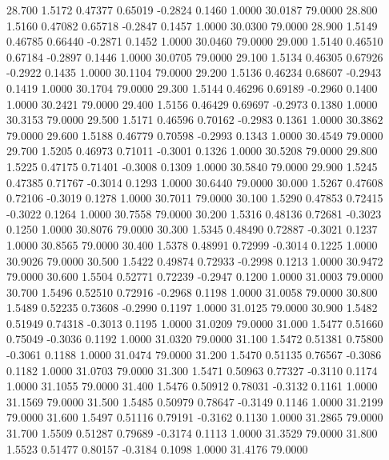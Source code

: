   28.700   1.5172   0.47377   0.65019  -0.2824   0.1460   1.0000  30.0187  79.0000
  28.800   1.5160   0.47082   0.65718  -0.2847   0.1457   1.0000  30.0300  79.0000
  28.900   1.5149   0.46785   0.66440  -0.2871   0.1452   1.0000  30.0460  79.0000
  29.000   1.5140   0.46510   0.67184  -0.2897   0.1446   1.0000  30.0705  79.0000
  29.100   1.5134   0.46305   0.67926  -0.2922   0.1435   1.0000  30.1104  79.0000
  29.200   1.5136   0.46234   0.68607  -0.2943   0.1419   1.0000  30.1704  79.0000
  29.300   1.5144   0.46296   0.69189  -0.2960   0.1400   1.0000  30.2421  79.0000
  29.400   1.5156   0.46429   0.69697  -0.2973   0.1380   1.0000  30.3153  79.0000
  29.500   1.5171   0.46596   0.70162  -0.2983   0.1361   1.0000  30.3862  79.0000
  29.600   1.5188   0.46779   0.70598  -0.2993   0.1343   1.0000  30.4549  79.0000
  29.700   1.5205   0.46973   0.71011  -0.3001   0.1326   1.0000  30.5208  79.0000
  29.800   1.5225   0.47175   0.71401  -0.3008   0.1309   1.0000  30.5840  79.0000
  29.900   1.5245   0.47385   0.71767  -0.3014   0.1293   1.0000  30.6440  79.0000
  30.000   1.5267   0.47608   0.72106  -0.3019   0.1278   1.0000  30.7011  79.0000
  30.100   1.5290   0.47853   0.72415  -0.3022   0.1264   1.0000  30.7558  79.0000
  30.200   1.5316   0.48136   0.72681  -0.3023   0.1250   1.0000  30.8076  79.0000
  30.300   1.5345   0.48490   0.72887  -0.3021   0.1237   1.0000  30.8565  79.0000
  30.400   1.5378   0.48991   0.72999  -0.3014   0.1225   1.0000  30.9026  79.0000
  30.500   1.5422   0.49874   0.72933  -0.2998   0.1213   1.0000  30.9472  79.0000
  30.600   1.5504   0.52771   0.72239  -0.2947   0.1200   1.0000  31.0003  79.0000
  30.700   1.5496   0.52510   0.72916  -0.2968   0.1198   1.0000  31.0058  79.0000
  30.800   1.5489   0.52235   0.73608  -0.2990   0.1197   1.0000  31.0125  79.0000
  30.900   1.5482   0.51949   0.74318  -0.3013   0.1195   1.0000  31.0209  79.0000
  31.000   1.5477   0.51660   0.75049  -0.3036   0.1192   1.0000  31.0320  79.0000
  31.100   1.5472   0.51381   0.75800  -0.3061   0.1188   1.0000  31.0474  79.0000
  31.200   1.5470   0.51135   0.76567  -0.3086   0.1182   1.0000  31.0703  79.0000
  31.300   1.5471   0.50963   0.77327  -0.3110   0.1174   1.0000  31.1055  79.0000
  31.400   1.5476   0.50912   0.78031  -0.3132   0.1161   1.0000  31.1569  79.0000
  31.500   1.5485   0.50979   0.78647  -0.3149   0.1146   1.0000  31.2199  79.0000
  31.600   1.5497   0.51116   0.79191  -0.3162   0.1130   1.0000  31.2865  79.0000
  31.700   1.5509   0.51287   0.79689  -0.3174   0.1113   1.0000  31.3529  79.0000
  31.800   1.5523   0.51477   0.80157  -0.3184   0.1098   1.0000  31.4176  79.0000
